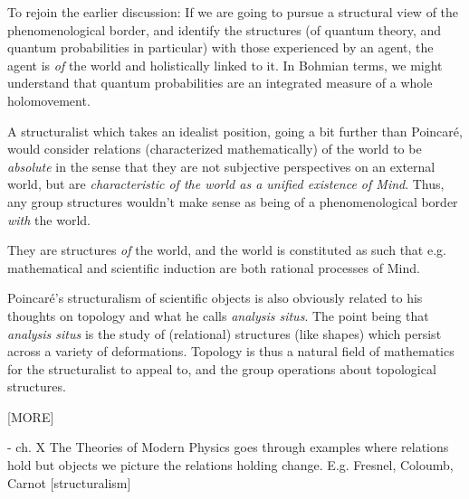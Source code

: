 To rejoin the earlier discussion: If we are going to pursue a structural view of the phenomenological border, and identify the structures (of quantum theory, and quantum probabilities in particular) with those experienced by an agent, the agent is \emph{of} the world and holistically linked to it.  In Bohmian terms, we might understand that quantum probabilities are an integrated measure of a whole holomovement.  

A structuralist which takes an idealist position, going a bit further than Poincar\'e, would consider relations (characterized mathematically) of the world to be \emph{absolute} in the sense that they are not subjective perspectives on an external world, but are \emph{characteristic of the world as a unified existence of Mind}.  Thus, any group structures wouldn't make sense as being of a phenomenological border \emph{with} the world.  

They are structures \emph{of} the world, and the world is constituted as such that e.g. mathematical and scientific induction are both rational processes of Mind.  



Poincar\'e's structuralism of scientific objects is also obviously related to his thoughts on topology and what he calls \emph{analysis situs}.  The point being that \emph{analysis situs} is the study of (relational) structures (like shapes) which persist across a variety of deformations.  Topology is thus a natural field of mathematics for the structuralist to appeal to, and the group operations about topological structures.





[MORE]





- ch. X The Theories of Modern Physics goes through examples where relations hold but objects we picture the relations holding change.  E.g. Fresnel, Coloumb, Carnot [structuralism]
 

